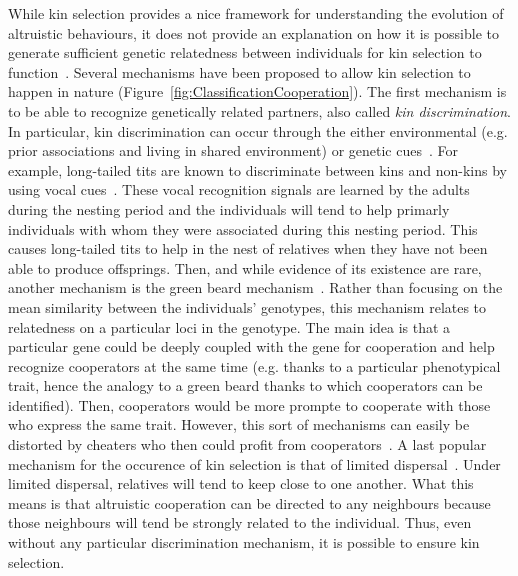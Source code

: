     While kin selection provides a nice framework for understanding the evolution of altruistic behaviours, it does not provide an explanation on how it is possible to generate sufficient genetic relatedness between individuals for kin selection to function~\parencite{West2007}. Several mechanisms have been proposed to allow kin selection to happen in nature (Figure~\ref{fig:ClassificationCooperation}). The first mechanism is to be able to recognize genetically related partners, also called \emph{kin discrimination}. In particular, kin discrimination can occur through the either environmental (e.g. prior associations and living in shared environment) or genetic cues~\parencite{Grafen1990}. For example, long-tailed tits are known to discriminate between kins and non-kins by using vocal cues~\parencite{Russell2001, Sharp2005}. These vocal recognition signals are learned by the adults during the nesting period and the individuals will tend to help primarly individuals with whom they were associated during this nesting period. This causes long-tailed tits to help in the nest of relatives when they have not been able to produce offsprings. Then, and while evidence of its existence are rare, another mechanism is the green beard mechanism~\parencite{Hamilton1964, Lehmann2006}. Rather than focusing on the mean similarity between the individuals' genotypes, this mechanism relates to relatedness on a particular loci in the genotype. The main idea is that a particular gene could be deeply coupled with the gene for cooperation and help recognize cooperators at the same time (e.g. thanks to a particular phenotypical trait, hence the analogy to a green beard thanks to which cooperators can be identified). Then, cooperators would be more prompte to cooperate with those who express the same trait. However, this sort of mechanisms can easily be distorted by cheaters who then could profit from cooperators~\parencite{West2007}. A last popular mechanism for the occurence of kin selection is that of limited dispersal~\parencite{Hamilton1972, Griffin2003}. Under limited dispersal, relatives will tend to keep close to one another. What this means is that altruistic cooperation can be directed to any neighbours because those neighbours will tend be strongly related to the individual. Thus, even without any particular discrimination mechanism, it is possible to ensure kin selection.

